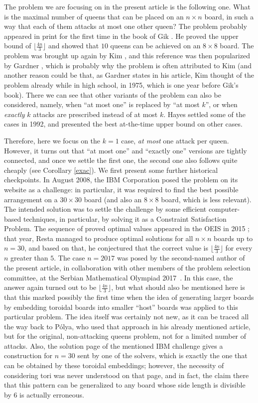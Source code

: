 \documentclass[10pt,a4paper]{article}
\theoremstyle{definition}
\begin{document}
The problem we are focusing on in the present article is the following one. What is the maximal number of queens that can be placed on an $n\times n$ board, in such a way that each of them attacks at most one other queen? The problem probably appeared in print for the first time in the book of Gik \cite{gik}. He proved the upper bound of $\lfloor\frac{4n}3\rfloor$ and showed that $10$ queens can be achieved on an $8\times 8$ board. The problem was brought up again by Kim \cite{kim}, and this reference was then popularized by Gardner \cite{gardner}, which is probably why the problem is often attributed to Kim (and another reason could be that, as Gardner states in his article, Kim thought of the problem already while in high school, in 1975, which is one year before Gik's book). There we can see that other variants of the problem can also be considered, namely, when ``at most one'' is replaced by ``at most $k$'', or when \emph{exactly} $k$ attacks are prescribed instead of at most $k$. Hayes \cite{hayes} settled some of the cases in 1992, and presented the best at-the-time upper bound on other cases.

Therefore, here we focus on the $k=1$ case, \emph{at most} one attack per queen. However, it turns out that ``at most one'' and ``exactly one'' versions are tightly connected, and once we settle the first one, the second one also follows quite cheaply (see Corollary \ref{exac}). We first present some further historical checkpoints. In August 2008, the IBM Corporation posed the problem on its website as a challenge: in particular, it was required to find the best possible arrangement on a $30\times 30$ board (and also an $8\times 8$ board, which is less relevant). The intended solution was to settle the challenge by some efficient computer-based techniques, in particular, by solving it as a Constraint Satisfaction Problem. The sequence of proved optimal values appeared in the OEIS in 2015 \cite{oeis}; that year, Resta \cite{resta} managed to produce optimal solutions for all $n\times n$ boards up to $n=30$, and based on that, he conjectured that the correct value is $\lfloor\frac{4n}3\rfloor$ for every $n$ greater than $5$. The case $n=2017$ was posed by the second-named author of the present article, in collaboration with other members of the problem selection committee, at the Serbian Mathematical Olympiad 2017~\cite{smo}. In this case, the answer again turned out to be $\lfloor\frac{4n}3\rfloor$, but what should also be mentioned here is that this marked possibly the first time when the idea of generating larger boards by embedding toroidal boards into smaller ``host'' boards was applied to this particular problem. The idea itself was certainly not new, as it can be traced all the way back to P\'olya, who used that approach in his already mentioned article, but for the original, non-attacking queens problem, not for a limited number of attacks. Also, the solution page of the mentioned IBM challenge gives a construction for $n=30$ sent by one of the solvers, which is exactly the one that can be obtained by these toroidal embeddings; however, the necessity of considering tori was never understood on that page, and in fact, the claim there that this pattern can be generalized to any board whose side length is divisible by $6$ is actually erroneous.
\end{document}
